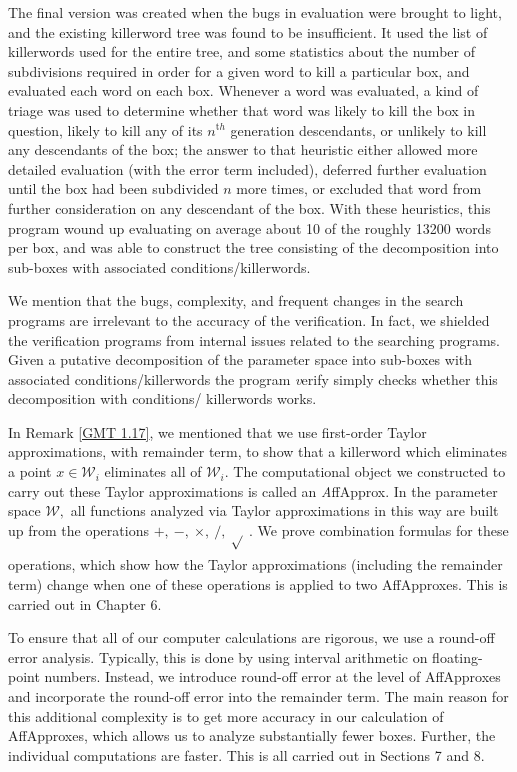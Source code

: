 \begin{remark}
The final version was created when the bugs in evaluation were 
brought to light, and the existing killerword tree was found to be insufficient.  
It used the list of killerwords used for the entire tree, and some 
statistics about the number of subdivisions required in order for a 
given word to kill a particular box, and evaluated each word on each box.  Whenever 
a word was evaluated, a kind of triage was used to determine 
whether that word was likely to kill the box in question, likely to kill 
any of its $n^{\mathrm th}$ generation descendants, or unlikely to kill any 
descendants of the box; the answer to that heuristic either allowed more 
detailed evaluation (with the error term included), deferred further 
evaluation until the box had been subdivided $n$ more times, or 
excluded that word from further consideration on any descendant of 
the box.  With these heuristics, this program wound up evaluating on 
average about 10 of the roughly 13200 words per box, and was able to 
construct the tree consisting of the decomposition into sub-boxes with associated conditions/killerwords.

We mention that the bugs, complexity, and 
frequent changes in the search programs are irrelevant to the 
accuracy of the verification.  In fact, we shielded the verification 
programs from internal issues related to the searching programs.  
Given a putative decomposition of the parameter space into 
sub-boxes with associated conditions/killerwords the program {\textit verify} 
simply checks whether this decomposition with conditions/ 
killerwords works. 
\end{remark}

\begin{preview}\label{GMT 1.35}
	In Remark \ref{GMT 1.17}, we mentioned that we use first-order Taylor approximations, with remainder term, to show that
a killerword which eliminates a point $x\in {\mathcal W}_i$ eliminates all of ${\mathcal W}_i.$  
The computational object we constructed to carry out these Taylor approximations is called an {\textit AffApprox}.
In the parameter space ${\mathcal W},$ all functions analyzed via Taylor
approximations in this way are built up from the
operations $ +,\ -,\ \times, \  /,\ \sqrt{}_{\phantom{|}} .$  We prove combination
formulas for these operations, which show how the Taylor approximations
(including the remainder term) change when one of these operations is
applied to two AffApproxes.   This is carried out in Chapter 6. 

To ensure that all of our computer calculations are rigorous, we use a round-off error analysis.  Typically, this is done by using interval
arithmetic on floating-point numbers. 
Instead, we introduce
round-off error at the level of AffApproxes and
incorporate the round-off error into the remainder term.  
The main reason for this additional complexity is to get
more accuracy in our calculation of AffApproxes, 
which allows us to analyze substantially fewer boxes.
Further, the individual computations are faster.
This is all
carried out in Sections 7 and 8.
\end{preview}
